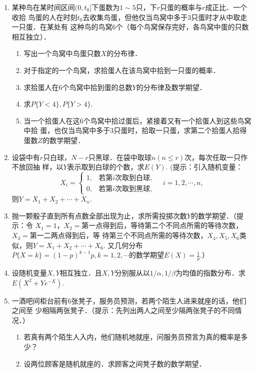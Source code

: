 \documentclass[10pt,a4paper]{article}
\begin{document}
\begin{enumerate}
    \item 某种鸟在某时间区间$(0,t_0]$下蛋数为$1\sim 5$只，下$r$只蛋的概率与$r$成正比．一个收拾
    鸟蛋的人在时刻$t_0$去收集鸟蛋，但他仅当鸟窝中多于3只蛋时才从中取走一只蛋．在某处有
    这种鸟的鸟窝6个（每个鸟窝保存完好，各鸟窝中蛋的只数相互独立）．
    \begin{enumerate}
        \item 写出一个鸟窝中鸟蛋只数$X$的分布律．
        \item 对于指定的一个鸟窝，求拾蛋人在该鸟窝中拾到一只蛋的概率．
        \item 求拾蛋人在6个鸟窝中拾到蛋的总数$Y$的分布律及数学期望．
        \item 求$P\{Y<4\},P\{Y>4\}$.
        \item 当一个拾蛋人在这6个鸟窝中拾过蛋后，紧接着又有一个拾蛋人到这些鸟窝中拾
        蛋，也仅当鸟窝中多于3只蛋时，拾取一只蛋，求第二个拾蛋人拾得蛋数$Z$的数学期望．
    \end{enumerate}



    \item 设袋中有$r$只白球，$N-r$只黑球．在袋中取球$n(n\leq r)$次，每次任取一只作不放回抽
    样，以$Y$表示取到白球的个数，求$E(Y)$. (提示：引入随机变量：
    $$X_i=\left\{\begin{array}{ll}
        1, & \mbox{若第}i\mbox{次取到白球},\\
        0, & \mbox{若第}i\mbox{次取到黑球},
    \end{array}\right.\quad
    i=1,2,\cdots,n,$$
    则$Y=X_1+X_2+\cdots+X_n$.



    \item 抛一颗骰子直到所有点数全部出现为止，求所需投掷次数$Y$的数学期望．（提示：令
    $X_1=1$，$X_2=$第一点得到后，等待第二个不同点所需的等待次数， $X_3=$第一二两点得到后，等
    待第三个不同点所需的等待次数，$X_4,X_5,X_6$类似，则$Y=X_1+X_2+\cdots+X_6$. 又几何分布
    $P\{X=k\}=(1-p)^{k-1}p,k=1,2,\cdots$的数学期望$E(X)=\frac{1}{p}$.）



    \item 设随机变量$X,Y$相互独立．且$X,Y$分别服从以$1/\alpha,1/\beta$为均值的指数分布．求
    $E(X^2+Ye^{-X})$.





    \item 一酒吧间柜台前有6张凳子，服务员预测，若两个陌生人进来就座的话，他们之间至
    少相隔两张凳子．（提示：先列出两人之间至少隔两张凳子的不同情况．）
    \begin{enumerate}
        \item 若真有两个陌生人入内，他们随机地就座，问服务员预言为真的概率是多少？
        \item 设两位顾客是随机就座的．求顾客之间凳子数的数学期望．
    \end{enumerate}





\end{enumerate}
\end{document}
